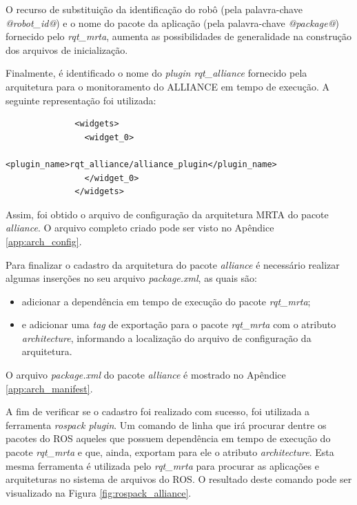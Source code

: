             O recurso de substituição da identificação do robô (pela palavra-chave \textit{@robot\_id@}) e o nome do pacote da aplicação (pela palavra-chave \textit{@package@}) fornecido pelo \textit{rqt\_mrta}, aumenta as possibilidades de generalidade na construção dos arquivos de inicialização.
            
            Finalmente, é identificado o nome do \textit{plugin rqt\_alliance} fornecido pela arquitetura para o monitoramento do ALLIANCE em tempo de execução. A seguinte representação foi utilizada:
            
            \begin{lstlisting}
              <widgets>
                <widget_0>
                  <plugin_name>rqt_alliance/alliance_plugin</plugin_name>
                </widget_0>
              </widgets>
            \end{lstlisting}
            
            Assim, foi obtido o arquivo de configuração da arquitetura MRTA do pacote \textit{alliance}. O arquivo completo criado pode ser visto no Apêndice \ref{app:arch_config}.
            
            Para finalizar o cadastro da arquitetura do pacote \textit{alliance} é necessário realizar algumas inserções no seu arquivo \textit{package.xml}, as quais são: 
            
            \begin{itemize}
                \item adicionar a dependência em tempo de execução do pacote \textit{rqt\_mrta};
                \item e adicionar uma \textit{tag} de exportação para o pacote \textit{rqt\_mrta} com o atributo \textit{architecture}, informando a localização do arquivo de configuração da arquitetura.
            \end{itemize}
            
            O arquivo \textit{package.xml} do pacote \textit{alliance} é mostrado no Apêndice \ref{app:arch_manifest}.
            
            A fim de verificar se o cadastro foi realizado com sucesso, foi utilizada a ferramenta \textit{rospack plugin}. Um comando de linha que irá procurar dentre os pacotes do ROS aqueles que possuem dependência em tempo de execução do pacote \textit{rqt\_mrta} e que, ainda, exportam para ele o atributo \textit{architecture}. Esta mesma ferramenta é utilizada pelo \textit{rqt\_mrta} para procurar as aplicações e arquiteturas no sistema de arquivos do ROS. O resultado deste comando pode ser visualizado na Figura \ref{fig:rospack_alliance}.
            
